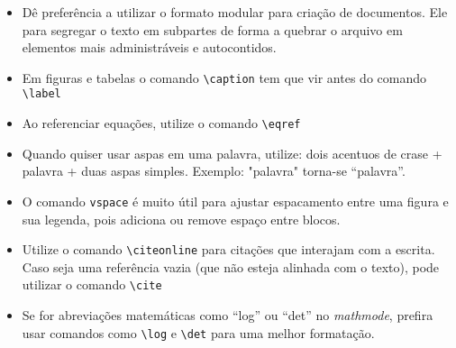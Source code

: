 \documentclass{article}
\begin{document}
\begin{itemize}
  \item Dê preferência a utilizar o formato modular para criação de documentos. Ele para segregar o texto em subpartes de forma a quebrar o arquivo em elementos mais administráveis e autocontidos.
  \item Em figuras e tabelas o comando \texttt{\textbackslash caption} tem que vir antes do comando \texttt{\textbackslash label}
  \item Ao referenciar equações, utilize o comando \texttt{\textbackslash eqref}
  \item Quando quiser usar aspas em uma palavra, utilize: dois acentuos de crase + palavra + duas aspas simples. 
    \subitem Exemplo: "palavra" torna-se ``palavra''.
  \item O comando \texttt{vspace} é muito útil para ajustar espacamento entre uma figura e sua legenda, pois adiciona ou remove espaço entre blocos.
  \item Utilize o comando \texttt{\textbackslash citeonline} para citações que interajam com a escrita. Caso seja uma referência vazia (que não esteja alinhada com o texto), pode utilizar o comando \texttt{\textbackslash cite} 
  \item Se for abreviações matemáticas como ``log'' ou ``det'' no \textit{mathmode}, prefira usar comandos como \texttt{\textbackslash log} e \texttt{\textbackslash det} para uma melhor formatação.
\end{itemize}

\end{document}
